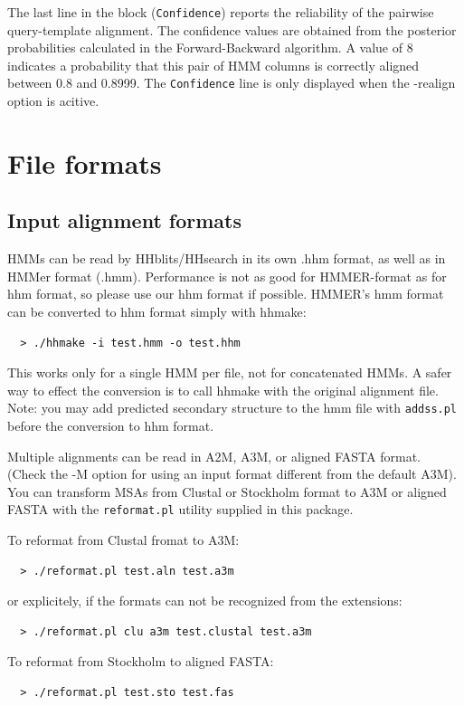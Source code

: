 \documentclass[11pt,a4paper]{article}
\begin{document}
The last line in the block ({\tt Confidence}) reports the reliability of the pairwise 
query-template alignment. The confidence values are obtained from the posterior 
probabilities calculated in the Forward-Backward algorithm. A value of 8 indicates
a probability that this pair of HMM columns is correctly aligned between 0.8 and 0.8999. 
The {\tt Confidence} line is only displayed when the -realign option is acitive.


\section{File formats}

\subsection{Input alignment formats}

HMMs can be read by HHblits/HHsearch in its own .hhm format, as well as in HMMer format (.hmm).
Performance is not as good for HMMER-format as for hhm format, so please use 
our hhm format if possible. HMMER's hmm format can be converted to hhm format simply 
with hhmake:
\begin{verbatim}
  > ./hhmake -i test.hmm -o test.hhm
\end{verbatim}

This works only for a single HMM per file, not for concatenated HMMs. A safer way to 
effect the conversion is to call hhmake with the original alignment file. Note: you 
may add predicted secondary structure to the hmm file with \verb`addss.pl` before the 
conversion to hhm format.

Multiple alignments can be read in A2M, A3M, or aligned FASTA format. (Check the -M option for 
using an input format different from the default A3M). You can transform MSAs 
from Clustal or Stockholm format to A3M or aligned FASTA with the \verb`reformat.pl` utility 
supplied in this package. 

To reformat from Clustal fromat to A3M:
\begin{verbatim}
  > ./reformat.pl test.aln test.a3m
\end{verbatim}
or explicitely, if the formats can not be recognized from the extensions:
\begin{verbatim}
  > ./reformat.pl clu a3m test.clustal test.a3m
\end{verbatim}
To reformat from Stockholm to aligned FASTA:
\begin{verbatim}
  > ./reformat.pl test.sto test.fas
\end{verbatim}
\end{document}
